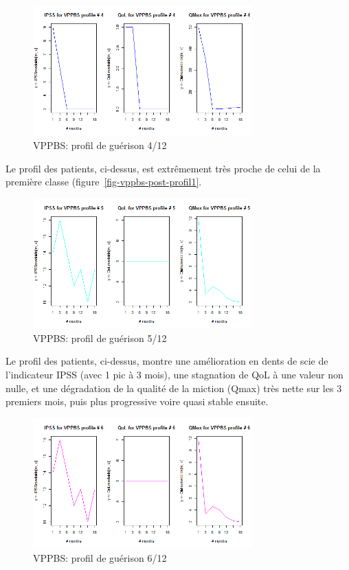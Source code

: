 \begin{figure}[H]
\centering
\includegraphics[width=0.75\textwidth]{../Fig/VPPBS/vppbs-profil-post-04.png}
\caption[]{VPPBS: profil de guérison 4/12}
\label{fig-vppbs-post-profil4}
\end{figure}

Le profil des patients, ci-dessus, est extrêmement très proche de celui de la première classe (figure~\ref{fig-vppbs-post-profil1}.

\begin{figure}[H]
\centering
\includegraphics[width=0.75\textwidth]{../Fig/VPPBS/vppbs-profil-post-05.png}
\caption[]{VPPBS: profil de guérison 5/12}
\label{fig-vppbs-post-profil5}
\end{figure}

Le profil des patients, ci-dessus, montre une amélioration en dents de scie de l'indicateur IPSS (avec 1 pic à 3  mois), une stagnation de QoL à une valeur non nulle, et une dégradation de la qualité de la miction (Qmax) très nette sur les 3 premiers mois, puis plus progressive voire quasi stable ensuite.

\begin{figure}[H]
\centering
\includegraphics[width=0.75\textwidth]{../Fig/VPPBS/vppbs-profil-post-06.png}
\caption[]{VPPBS: profil de guérison 6/12}
\label{fig-vppbs-post-profil6}
\end{figure}

